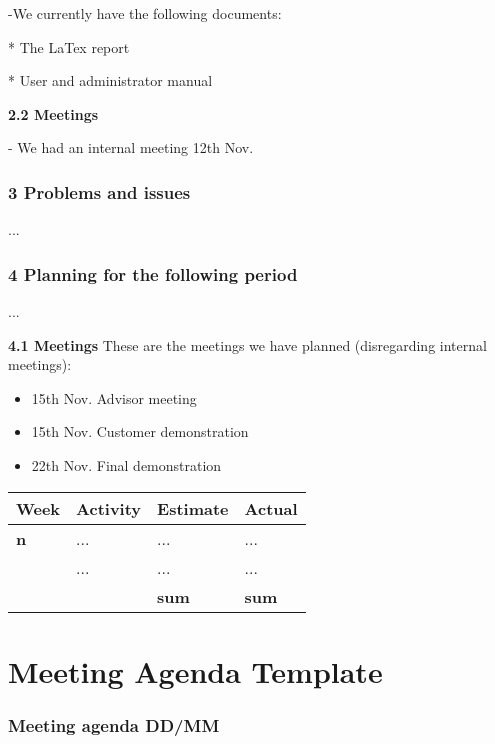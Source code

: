-We currently have the following documents:

* The LaTex report

* User and administrator manual

\textbf{2.2 Meetings}

 - We had an internal meeting 12th Nov.


\subsubsection{3 Problems and issues}

...


\subsubsection{4 Planning for the following period}

...

\textbf{4.1 Meetings}
These are the meetings we have planned (disregarding internal meetings):
\begin{itemize}
\item 15th Nov. Advisor meeting
\item 15th Nov. Customer demonstration
\item 22th Nov. Final demonstration
\end{itemize}

\begin{center}
\begin{tabularx}{\textwidth}{ l l l X }
\textbf{Week} & \textbf{Activity} & \textbf{Estimate} &  \textbf{Actual} \\ \hline
\textbf{n} & ... & ... & ... \\ \hline
  & ... & ... & ... \\ \hline
  &  & \textbf{sum} & \textbf{sum} \\ \hline
\end{tabularx}
\end{center}



\section{Meeting Agenda Template}
\label{meetingagendatemplate}

\subsubsection{Meeting agenda DD/MM}

